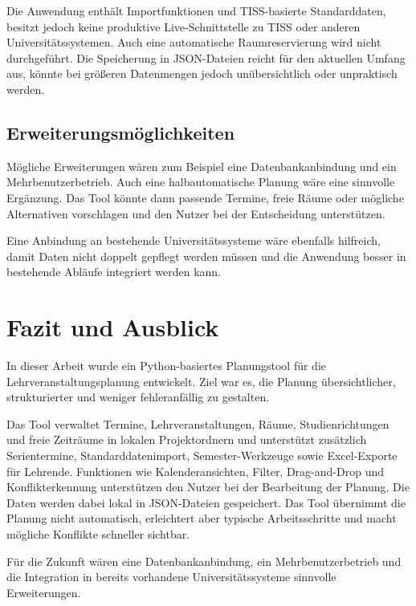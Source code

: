 \documentclass[12pt,a4paper]{article}
\begin{document}
Die Anwendung enthält Importfunktionen und TISS-basierte Standarddaten, besitzt jedoch keine produktive Live-Schnittstelle zu TISS oder anderen Universitätssystemen. Auch eine automatische Raumreservierung wird nicht durchgeführt.
Die Speicherung in JSON-Dateien reicht für den aktuellen Umfang aus, könnte bei größeren Datenmengen jedoch unübersichtlich oder unpraktisch werden.


\subsection{Erweiterungsmöglichkeiten}

Mögliche Erweiterungen wären zum Beispiel eine Datenbankanbindung und ein Mehrbenutzerbetrieb.
Auch eine halbautomatische Planung wäre eine sinnvolle Ergänzung. Das Tool könnte dann passende Termine, freie Räume oder mögliche Alternativen vorschlagen und den Nutzer bei der Entscheidung unterstützen.

Eine Anbindung an bestehende Universitätssysteme wäre ebenfalls hilfreich, damit Daten nicht doppelt gepflegt werden müssen und die Anwendung besser in bestehende Abläufe integriert werden kann.

\clearpage

\section{Fazit und Ausblick}

In dieser Arbeit wurde ein Python-basiertes Planungstool für die Lehrveranstaltungsplanung entwickelt. Ziel war es, die Planung übersichtlicher, strukturierter und weniger fehleranfällig zu gestalten.

Das Tool verwaltet Termine, Lehrveranstaltungen, Räume, Studienrichtungen und freie Zeiträume in lokalen Projektordnern und unterstützt zusätzlich Serientermine, Standarddatenimport, Semester-Werkzeuge sowie Excel-Exporte für Lehrende. Funktionen wie Kalenderansichten, Filter, Drag-and-Drop und Konflikterkennung unterstützen den Nutzer bei der Bearbeitung der Planung.
Die Daten werden dabei lokal in JSON-Dateien gespeichert. Das Tool übernimmt die Planung nicht automatisch, erleichtert aber typische Arbeitsschritte und macht mögliche Konflikte schneller sichtbar.

Für die Zukunft wären eine Datenbankanbindung, ein Mehrbenutzerbetrieb und die Integration in bereits vorhandene Universitätssysteme sinnvolle Erweiterungen.

\clearpage
\end{document}
